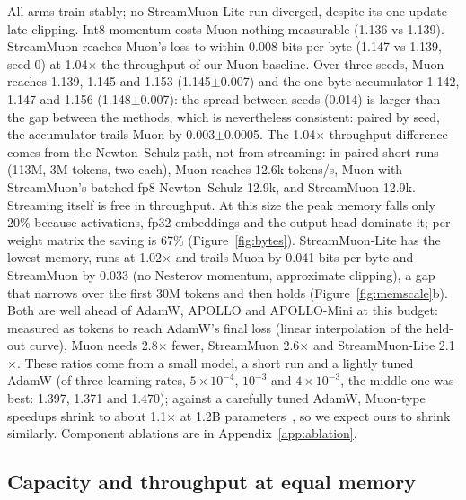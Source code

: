 \documentclass[10pt]{article}
\newcommand{\method}{StreamMuon}\newcommand{\lite}{StreamMuon-Lite}
\begin{document}
All arms train stably; no \lite{} run diverged, despite its one-update-late clipping. Int8 momentum costs Muon nothing measurable (1.136 vs 1.139). \method{} reaches Muon's loss
to within 0.008 bits per byte (1.147 vs 1.139, seed 0) at 1.04$\times$ the
throughput of our Muon baseline. Over three seeds, Muon reaches 1.139, 1.145 and 1.153 (1.145$\pm$0.007) and the
one-byte accumulator 1.142, 1.147 and 1.156 (1.148$\pm$0.007): the spread between seeds (0.014) is larger than the gap
between the methods, which is nevertheless consistent: paired by seed, the accumulator trails Muon by 0.003$\pm$0.0005. The 1.04$\times$ throughput difference comes from the Newton--Schulz path, not from streaming: in paired
short runs (113M, 3M tokens, two each), Muon reaches 12.6k tokens/s, Muon with \method{}'s batched fp8 Newton--Schulz
12.9k, and \method{} 12.9k. Streaming itself is free in throughput. At this size
the peak memory falls only 20\% because activations, fp32 embeddings and the output head dominate it; per weight
matrix the saving is 67\% (Figure~\ref{fig:bytes}). \lite{} has the lowest memory, runs at 1.02$\times$ and trails Muon
by 0.041 bits per byte and \method{} by 0.033 (no Nesterov momentum, approximate clipping), a gap that narrows over the
first 30M tokens and then holds (Figure~\ref{fig:memscale}b). Both are well ahead of AdamW, APOLLO and APOLLO-Mini at
this budget: measured as tokens to reach AdamW's final loss (linear interpolation of the held-out curve), Muon needs
2.8$\times$ fewer, \method{} 2.6$\times$ and \lite{} 2.1$\times$. These ratios come from a small model, a short run and a
lightly tuned AdamW (of three learning rates, $5\times10^{-4}$, $10^{-3}$ and $4\times10^{-3}$, the middle one was best: 1.397, 1.371 and 1.470); against a carefully tuned AdamW, Muon-type
speedups shrink to about 1.1$\times$ at 1.2B parameters~\citep{wen2026fantastic}, so we expect ours to shrink
similarly. Component ablations are in Appendix~\ref{app:ablation}.

\subsection{Capacity and throughput at equal memory}
\label{sec:capacity}
\label{sec:memory}
\end{document}
